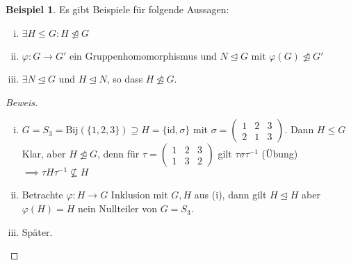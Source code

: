 \documentclass[a4paper]{report}
\theoremstyle{plain}
\theoremstyle{definition}
\newtheorem*{bsp*}{Beispiel}
\begin{document}
\begin{bsp*} Es gibt Beispiele für folgende Aussagen:
  \begin{enumerate}[(i)]
    \item $\exists H \le G : H \not \trianglelefteq G$
    \item $\varphi : G \to G'$ ein Gruppenhomomorphismus und $N \trianglelefteq G$ mit $\varphi(G) \not \trianglelefteq G'$
    \item $\exists N \trianglelefteq G$ und $H \trianglelefteq N$, so dass $H \not \trianglelefteq G$.
  \end{enumerate}
\end{bsp*}
  \begin{proof}[Beweis] \item
  \begin{enumerate}[(i)]
    \item $G = S_{3} = \mathrm{Bij}(\{1,2,3\}) \supseteq H = \{\mathrm{id}, \sigma\}$ mit $\sigma = \begin{pmatrix} 1 & 2 & 3 \\ 2 & 1 & 3\end{pmatrix}$. Dann $H \le G$ Klar, aber $H \not \trianglelefteq G$, denn für $\tau = \begin{pmatrix} 1 & 2 & 3 \\ 1 & 3 & 2\end{pmatrix}$ gilt $\tau \sigma \tau^{-1}$ (Übung) $\implies \tau H\tau^{-1} \not \subseteq H$
    \item Betrachte $\varphi: H \to G$ Inklusion mit $G, H$ aus (i), dann gilt $H \trianglelefteq H$ aber $\varphi(H) = H$ nein Nullteiler von $G = S_{3}$.
    \item Später.
   \end{enumerate}
  \end{proof}
\end{document}
